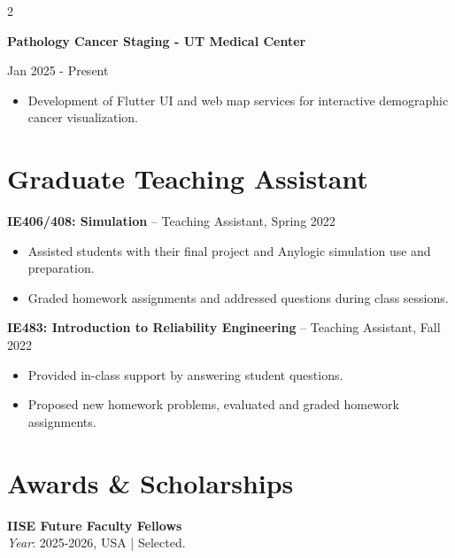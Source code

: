 \documentclass[10pt, letterpaper]{article}
\newenvironment{highlights}{
    \begin{itemize}[
        topsep=0.10 cm,
        parsep=0.10 cm,
        partopsep=0pt,
        itemsep=0pt,
        leftmargin=0 cm + 10pt
    ]
}{
    \end{itemize}
} %
\newenvironment{twocolentry}[2][]{
    \onecolentry
    \def\secondColumn{#2}
    \setcolumnwidth{\fill, 4.5 cm}
    \begin{paracol}{2}
}{
    \switchcolumn \raggedleft \secondColumn
    \end{paracol}
    \endonecolentry
} %
\begin{document}
    \vspace{0.3cm} 
    \begin{twocolentry}{Jan 2025 - Present} 
        \textbf{Pathology Cancer Staging - UT Medical Center} 
    \end{twocolentry} 
    \begin{highlights} 
        \item Development of Flutter UI and web map services for interactive demographic cancer visualization. 
    \end{highlights} 
    \vspace{0.3cm} 
    \noindent
    







\section*{Graduate Teaching Assistant}

\textbf{IE406/408: Simulation} – Teaching Assistant, Spring 2022  
\begin{itemize}
    \item Assisted students with their final project and Anylogic simulation use and preparation.
    \item Graded homework assignments and addressed questions during class sessions.
\end{itemize}

\textbf{IE483: Introduction to Reliability Engineering} – Teaching Assistant, Fall 2022  
\begin{itemize}
    \item Provided in-class support by answering student questions.
    \item Proposed new homework problems, evaluated and graded homework assignments.
\end{itemize}


    \section*{Awards \& Scholarships}
    \small



    \noindent \textbf{IISE Future Faculty Fellows} \\
    \textit{Year}: 2025-2026, USA | Selected.


  \vspace{0.5em}
\end{document}
